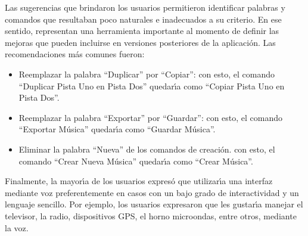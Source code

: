 Las sugerencias que brindaron los usuarios permitieron identificar palabras y comandos que 
resultaban poco naturales e inadecuados a su criterio. En ese sentido, representan una herramienta
importante al momento de definir las mejoras que pueden incluirse en versiones posteriores de la
aplicaci\'on. Las recomendaciones m\'as comunes fueron:

\begin{itemize}
	\item Reemplazar la palabra ``Duplicar'' por ``Copiar'': con esto, el comando 
	``Duplicar Pista Uno en Pista Dos'' quedar{\'\i}a como ``Copiar Pista Uno en Pista Dos''. 
	\item Reemplazar la palabra ``Exportar'' por ``Guardar'': con esto, el comando 
	``Exportar M\'usica'' quedar{\'\i}a como ``Guardar M\'usica''.
	\item Eliminar la palabra ``Nueva'' de los comandos de creaci\'on. con esto, el comando 
	``Crear Nueva M\'usica'' quedar{\'\i}a como ``Crear M\'usica''.
\end{itemize}

Finalmente, la mayor{\'\i}a de los usuarios expres\'o que utilizar{\'\i}a una interfaz mediante voz
preferentemente en casos con un bajo grado de interactividad y un lenguaje sencillo.
Por ejemplo, los usuarios expresaron que les gustar{\'\i}a manejar el televisor, la radio,
dispositivos GPS, el horno microondas, entre otros, mediante la voz.


